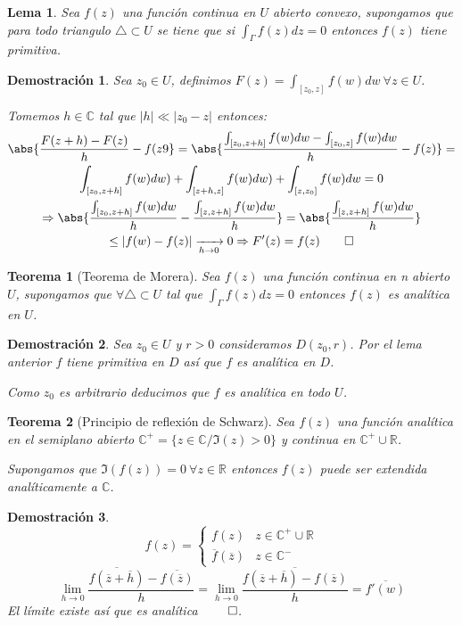 \documentclass[12pt]{book}
\newtheorem{theorem}{Teorema}[chapter]
\newtheorem*{dem}{Demostración}
\newtheorem{lema}{Lema}[chapter]
\newcommand{\R}{\mathbb{R}}
\newcommand{\C}{\mathbb{C}}
\begin{document}
\begin{lema}
Sea $f(z)$ una función continua en $U$ abierto convexo, supongamos que para todo triangulo $\triangle \subset U$ se tiene que si $\int_\Gamma f(z)dz =0$ entonces $f(z)$ tiene primitiva.
\end{lema}

\begin{dem}
Sea $z_0 \in U$, definimos $F(z) = \int_{[z_0,z]} f(w)dw \ \forall z\in U$.

Tomemos $h \in \C$ tal que $|h| \ll |z_0-z|$ entonces:
\begin{multline*}
\abs{ \frac{F(z+h)-F(z)}{h}-f(z9} = \abs{ \frac{\int_{[z_0,z+h]}f(w)dw -\int_{[z_0,z]}f(w)dw}{h}-f(z)} =\\
 \int_{[z_0,z+h]}f(w)dw) + \int_{[z+h,z]}f(w)dw)+\int_{[z,z_0]}f(w)dw = 0\\
\Rightarrow \abs{ \frac{\int_{[z_0,z+h]}f(w)dw}{h} - \frac{\int_{[z,z+h]}f(w)dw}{h}} = \abs{ \frac{\int_{[z,z+h]}f(w)dw}{h}} \\
\leq |f(w)-f(z)| \xrightarrow[h\to 0]{} 0 \Rightarrow F'(z) = f(z) \qed
\end{multline*}
\end{dem}


\begin{theorem}[Teorema de Morera]
Sea $f(z)$ una función continua en n abierto $U$, supongamos que $\forall \triangle \subset U$ tal que $\int_\Gamma f(z)dz =0$ entonces $f(z)$ es analítica en $U$.
\end{theorem}

\begin{dem}
Sea $z_0\in U$ y $r>0$ consideramos $D(z_0,r)$. Por el lema anterior $f$ tiene primitiva en $D$ así que $f$ es analítica en $D$.

Como $z_0$ es arbitrario deducimos que $f$ es analítica en todo $U$.
\end{dem}

\begin{theorem}[Principio de reflexión de Schwarz]
Sea $f(z)$ una función analítica en el semiplano abierto $\C^+ = \{z\in\C / \Im(z) >0\}$ y continua en $\C^+ \cup \R$.

Supongamos que $\Im(f(z)) = 0\ \forall z\in \R$ entonces $f(z)$ puede ser extendida analíticamente a $\C$.
\end{theorem}

\begin{dem}
$$
f(z) = \left\{\begin{array}{cc} f(z) &z\in \C^+ \cup \R \\
						\overline{f}(\overline{z}) &z\in\C^-
		\end{array}\right.
$$$$
\lim_{h\to 0} \frac{\overline{f(\overline{z}+\overline{h})}-\overline{f(\overline{z})}}{h} = \lim_{h\to 0} \frac{\overline{f(\overline{z}+\overline{h})-f(\overline{z})}}{h} = \overline{f'(w)} 
$$
El límite existe así que es analítica $\qed$.
\end{dem}
\end{document}
